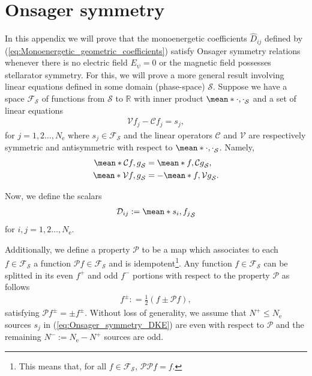 \documentclass[10pt]{iopart}
\begin{document}
\section{Onsager symmetry}
\label{sec:Appendix_Onsager_symmetry}
In this appendix we will prove that the monoenergetic coefficients $\widehat{D}_{ij}$ defined by (\ref{eq:Monoenergetic_geometric_coefficients}) satisfy Onsager symmetry relations whenever there is no electric field $E_\psi=0$ or the magnetic field possesses stellarator symmetry. For this, we will prove a more general result involving linear equations defined in some domain (phase-space) $\mathcal{S}$. Suppose we have a space $\mathcal{F_S}$ of functions from $\mathcal{S}$ to $\mathbb{R}$ with inner product $\mean*{\cdot,\cdot}_{\mathcal{S}}$ and a set of linear equations
%
\begin{align}
	\mathcal{V} f_j - \mathcal{C}f_j = s_j,
	\label{eq:Onsager_symmetry_DKE}
\end{align}
for $j=1,2\ldots, N_{\text{e}} $ where $s_j\in\mathcal{F_S}$ and the linear operators $\mathcal{C}$ and $\mathcal{V}$ are respectively symmetric and antisymmetric with respect to $\mean*{\cdot,\cdot}_{\mathcal{S}}$. Namely,
%
\begin{align}
	\mean*{\mathcal{C}f,g}_{\mathcal{S}} & = \mean*{f,\mathcal{C}g}_{\mathcal{S}}, 
	\label{eq:Onsager_symmetry_Collision_Symmetry}\\
	\mean*{\mathcal{V}f,g}_{\mathcal{S}} & = -\mean*{f,\mathcal{V}g}_{\mathcal{S}}.
	\label{eq:Onsager_symmetry_Vlasov_Skew_Symmetry}
\end{align}



Now, we define the scalars 
%
\begin{align}
	\mathcal{D}_{ij} := \mean*{ s_i, f_j}_{\mathcal{S}}
	\label{eq:Onsager_symmetry_coefficients}
\end{align}
for $i,j=1,2\ldots, N_{\text{e}} $.

Additionally, we define a property $\mathcal{P}$ to be a map which associates to each $f\in\mathcal{F_S}$ a function $\mathcal{P} f \in\mathcal{F_S}$ and is idempotent\footnote{This means that, for all $f\in\mathcal{F_S}$, $\mathcal{P} \mathcal{P} f=f$.}. Any function $f\in\mathcal{F_S}$ can be splitted in its even $f^+$ and odd $f^-$ portions with respect to the property $\mathcal{P}$ as follows
%
\begin{align}
	f^\pm : = 
	\frac{1}{2}
	\left(
	f \pm \mathcal{P} f
	\right),
\end{align}
satisfying $\mathcal{P} f^\pm = \pm f^\pm$. Without loss of generality, we assume that $N^+\le N_{\text{e}}$ sources $s_j$ in (\ref{eq:Onsager_symmetry_DKE}) are even with respect to $\mathcal{P}$ and the remaining $N^- := N_{\text{e}}- N^+$ sources are odd. 
\end{document}
